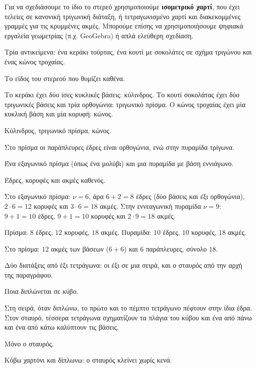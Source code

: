 Για να σχεδιάσουμε το ίδιο το στερεό χρησιμοποιούμε \textbf{ισομετρικό χαρτί}, που έχει τελείες σε κανονική τριγωνική διάταξη, ή τετραγωνισμένο χαρτί και διακεκομμένες γραμμές για τις κρυμμένες ακμές. Μπορούμε επίσης να χρησιμοποιήσουμε ψηφιακά εργαλεία γεωμετρίας (π.χ. GeoGebra) ή απλά ελεύθερη σχεδίαση.


\tixero Τρία αντικείμενα: ένα κεράκι τούρτας, ένα κουτί με σοκολάτες σε σχήμα τριγώνου και ένας κώνος τροχαίας.\par
\tithelo Το είδος του στερεού που θυμίζει καθένα.\par
\possindeo Το κεράκι έχει δύο ίσες κυκλικές βάσεις: κύλινδρος. Το κουτί σοκολάτας έχει δύο τριγωνικές βάσεις και τρία ορθογώνια: τριγωνικό πρίσμα. Ο κώνος τροχαίας έχει μία κυκλική βάση και μία κορυφή: κώνος.\par
\apantisi Κύλινδρος, τριγωνικό πρίσμα, κώνος.\par
\elegxos Στο πρίσμα οι παράπλευρες έδρες είναι ορθογώνια, ενώ στην πυραμίδα τρίγωνα.

\tixero Ένα εξαγωνικό πρίσμα (όπως ένα μολύβι) και μια πυραμίδα με βάση εννιάγωνο.\par
\tithelo Έδρες, κορυφές και ακμές καθενός.\par
\possindeo Στο εξαγωνικό πρίσμα: $\nu=6$, άρα $6+2=8$ έδρες (δύο βάσεις και έξι ορθογώνια), $2\cdot6=12$ κορυφές και $3\cdot6=18$ ακμές. Στην εννεαγωνική πυραμίδα $\nu=9$: $9+1=10$ έδρες, $9+1=10$ κορυφές και $2\cdot9=18$ ακμές.\par
\apantisi Πρίσμα: $8$ έδρες, $12$ κορυφές, $18$ ακμές. Πυραμίδα: $10$ έδρες, $10$ κορυφές, $18$ ακμές.\par
\elegxos Στο πρίσμα: $12$ ακμές των βάσεων ($6+6$) και $6$ παράπλευρες, σύνολο $18$.

\tixero Δύο διατάξεις από έξι τετράγωνα: οι έξι σε μια σειρά, και ο σταυρός από την αρχή της παραγράφου.\par
\tithelo Ποια διπλώνεται σε κύβο.\par
\possindeo Στη σειρά, όταν διπλώνω, το πρώτο και το πέμπτο τετράγωνο πέφτουν στην ίδια έδρα. Στον σταυρό, τέσσερα τετράγωνα σχηματίζουν τα πλάγια του κύβου και ένα από πάνω και ένα από κάτω καλύπτουν τις βάσεις.\par
\apantisi Μόνο ο σταυρός.\par
\elegxos Κόβω χαρτόνι και δίπλωνω: ο σταυρός κλείνει χωρίς κενά.


